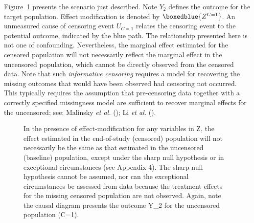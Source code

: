 \documentclass[
  singlecolumn]{article}
\begin{document}
Figure~\ref{fig-experiment-selection-restriction-adjustment-2} presents
the scenario just described. Note \(Y_2\) defines the outcome for the
target population. Effect modification is denoted by
\(\boxedblue{Z^{C=1}}\). An unmeasured cause of censoring event
\(U_{C=1}\) relates the censoring event to the potential outcome,
indicated by the blue path. The relationship presented here is not one
of confounding. Nevertheless, the marginal effect estimated for the
censored population will not necessarily reflect the marginal effect in
the uncensored population, which cannot be directly observed from the
censored data. Note that such \emph{informative censoring} requires a
model for recovering the missing outcomes that would have been observed
had censoring not occurred. This typically requires the assumption that
pre-censoring data together with a correctly specified missingness model
are sufficient to recover marginal effects for the uncensored; see:
Malinsky \emph{et al.}
(); Li \emph{et al.}
().

\begin{figure}


\caption{\label{fig-experiment-selection-restriction-adjustment-2}In the
presence of effect-modification for any variables in Z, the effect
estimated in the end-of-study (censored) population will not necessarily
be the same as that estimated in the uncensored (baseline) population,
except under the sharp null hypothesis or in exceptional circumstances
(see Appendix 4). The sharp null hypothesis cannot be assumed, nor can
the exceptional circumstances be assessed from data because the
treatment effects for the missing censored population are not observed.
Again, note the causal diagram presents the outcome Y\_2 for the
uncensored population (C=1).}

\end{figure}%
\end{document}
